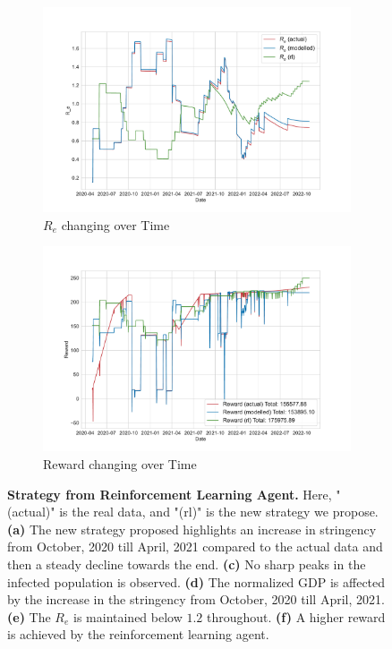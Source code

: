 \documentclass[tikz,fleqn,12pt]{wlscirep}
\begin{document}
\begin{figure}[htbp!]
\begin{subfigure}[t]{0.48\textwidth}
    \includegraphics[width=\linewidth]{images/175975/rl_r_eff.pdf}
    \caption{$R_e$ changing over Time}
  \end{subfigure}
  \label{fig:175975_rl_r_eff}
  \hfill
  \begin{subfigure}[t]{0.48\textwidth}
    \centering
    \includegraphics[width=\linewidth]{images/175975/rl_reward.pdf}
    \caption{Reward changing over Time}
  \end{subfigure}
  \label{fig:175975_rl_reward}
  \caption{\textbf{Strategy from Reinforcement Learning Agent.} Here, "(actual)" is the real data, and "(rl)" is the new strategy we propose. \textbf{(a)} The new strategy proposed highlights an increase in stringency from October, 2020 till April, 2021 compared to the actual data and then a steady decline towards the end. \textbf{(c)} No sharp peaks in the infected population is observed. \textbf{(d)} The normalized GDP is affected by the increase in the stringency from October, 2020 till April, 2021. \textbf{(e)} The $R_e$ is maintained below $1.2$ throughout. \textbf{(f)} A higher reward is achieved by the reinforcement learning agent.}
\end{figure}
\end{document}
